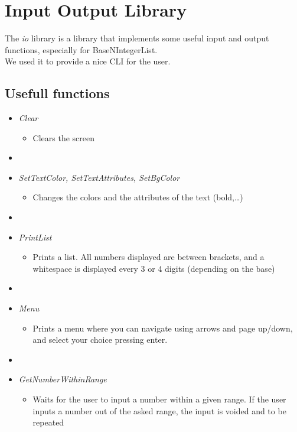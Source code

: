 \documentclass[book, backcover, english, nodocumentinfo]{upmethodology-document}
\begin{document}
\chapter{Input Output Library} \label{chapter:IO-Lib}
	The \textit{io} library is a library that implements some useful input and output functions, especially for BaseNIntegerList.\\
	We used it to provide a nice CLI for the user.\\
	\section{Usefull functions}
		\begin{itemize}
			\item{}\textit{Clear}
				\begin{itemize}
					\item[]{} Clears the screen
				\end{itemize}
				\item[]{}
			\item{}\textit{SetTextColor, SetTextAttributes, SetBgColor}
				\begin{itemize}
					\item[]{} Changes the colors and the attributes of the text (bold,\ldots)
				\end{itemize}
				\item[]{}
			\item{}\textit{PrintList}
				\begin{itemize}
					\item[]{} Prints a list. All numbers displayed are between brackets, and a whitespace is displayed every 3 or 4 digits (depending on the base)
				\end{itemize}
				\item[]{}
			\item{}\textit{Menu}
				\begin{itemize}
					\item[]{} Prints a menu where you can navigate using arrows and page up/down, and select your choice pressing enter.
				\end{itemize}
				\item[]{}
			\item{}\textit{GetNumberWithinRange}
				\begin{itemize}
					\item[]{} Waits for the user to input a number within a given range. If the user inputs a number out of the asked range, the input is voided and to be repeated
				\end{itemize}

\end{itemize}
\end{document}
